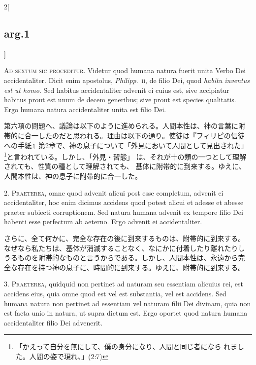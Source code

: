 \documentclass[paper=a4paper,fontsize=10pt,jafontsize=9pt,titlepage]{jlreq}
\begin{document}
\begin{paracol}{2}[\subsection{arg.1}]

{\scshape Ad sextum sic proceditur}. Videtur quod humana natura fuerit
unita Verbo Dei accidentaliter. Dicit enim apostolus, {\itshape
Philipp}.~{\scshape ii}, de filio Dei, quod {\itshape habitu inventus
est ut homo}. Sed habitus accidentaliter advenit ei cuius est, sive
accipiatur habitus prout est unum de decem generibus; sive prout est
species qualitatis. Ergo humana natura accidentaliter unita est filio
Dei.

\switchcolumn

第六項の問題へ、議論は以下のように進められる。人間本性は、神の言葉に附
帯的に合一したのだと思われる。理由は以下の通り。使徒は『フィリピの信徒
への手紙』第2章で、神の息子について「外見において人間として見出された」
\footnote{「かえって自分を無にして、僕の身分になり、人間と同じ者になら
れました。人間の姿で現れ、」(2:7)}と言われている。しかし、「外見・習態」
は、それが十の類の一つとして理解されても、性質の種として理解されても、
基体に附帯的に到来する。ゆえに、人間本性は、神の息子に附帯的に合一した。


2. {\scshape Praeterea}, omne quod advenit alicui post esse completum,
advenit ei accidentaliter, hoc enim dicimus accidens quod potest
alicui et adesse et abesse praeter subiecti corruptionem. Sed natura
humana advenit ex tempore filio Dei habenti esse perfectum ab
aeterno. Ergo advenit ei accidentaliter.

\switchcolumn

さらに、全て何かに、完全な存在の後に到来するものは、附帯的に到来する。
なぜなら私たちは、基体が消滅することなく、なにかに付着したり離れたりし
うるものを附帯的なものと言うからである。しかし、人間本性は、永遠から完
全な存在を持つ神の息子に、時間的に到来する。ゆえに、附帯的に到来する。


3. {\scshape Praeterea}, quidquid non pertinet ad naturam seu
essentiam alicuius rei, est accidens eius, quia omne quod est vel est
substantia, vel est accidens. Sed humana natura non pertinet ad
essentiam vel naturam filii Dei divinam, quia non est facta unio in
natura, ut supra dictum est. Ergo oportet quod natura humana
accidentaliter filio Dei advenerit.


\end{paracol}
\end{document}
